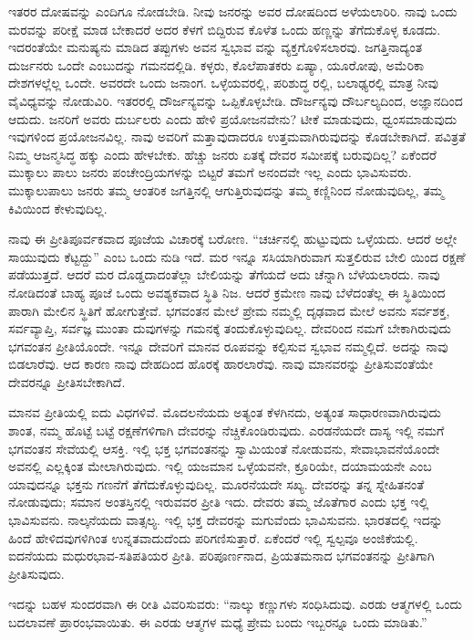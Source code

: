 ಇತರರ ದೋಷವನ್ನು ಎಂದಿಗೂ ನೋಡಬೇಡಿ. ನೀವು ಜನರನ್ನು ಅವರ ದೋಷದಿಂದ ಅಳೆಯಲಾರಿರಿ. ನಾವು ಒಂದು ಮರವನ್ನು ಪರೀಕ್ಷೆ ಮಾಡ ಬೇಕಾದರೆ ಅದರ ಕೆಳಗೆ ಬಿದ್ದಿರುವ ಕೊಳೆತ ಒಂದು ಹಣ್ಣನ್ನು ತೆಗೆದುಕೊಳ್ಳ ಕೂಡದು. ಇದರಂತೆಯೇ ಮನುಷ್ಯನು ಮಾಡಿದ ತಪ್ಪುಗಳು ಅವನ ಸ್ವಭಾವ ವನ್ನು ವ್ಯಕ್ತಗೊಳಿಸಲಾರವು. ಜಗತ್ತಿನಾದ್ಯಂತ ದುರ್ಜನರು ಒಂದೇ ಎಂಬುದನ್ನು ಗಮನದಲ್ಲಿಡಿ. ಕಳ್ಳರು, ಕೊಲೆಪಾತಕರು ಏಷ್ಯಾ, ಯೂರೋಪು, ಅಮೆರಿಕಾ ದೇಶಗಳಲ್ಲೆಲ್ಲ ಒಂದೇ. ಅವರದೇ ಒಂದು ಜನಾಂಗ. ಒಳ್ಳೆಯವರಲ್ಲಿ, ಪರಿಶುದ್ಧ ರಲ್ಲಿ, ಬಲಾಢ್ಯರಲ್ಲಿ ಮಾತ್ರ ನೀವು ವೈವಿಧ್ಯವನ್ನು ನೋಡುವಿರಿ. ಇತರರಲ್ಲಿ ದೌರ್ಜನ್ಯವನ್ನು ಒಪ್ಪಿಕೊಳ್ಳಬೇಡಿ. ದೌರ್ಜನ್ಯವು ದೌರ್ಬಲ್ಯದಿಂದ, ಅಜ್ಞಾನದಿಂದ ಆದುದು. ಜನರಿಗೆ ಅವರು ದುರ್ಬಲರು ಎಂದು ಹೇಳಿ ಪ್ರಯೋಜನವೇನು? ಟೀಕೆ ಮಾಡುವುದು, ಧ್ವಂಸಮಾಡುವುದು ಇವುಗಳಿಂದ ಪ್ರಯೋಜನವಿಲ್ಲ. ನಾವು ಅವರಿಗೆ ಮತ್ತಾವುದಾದರೂ ಉತ್ತಮವಾಗಿರುವುದನ್ನು ಕೊಡಬೇಕಾಗಿದೆ. ಪವಿತ್ರತೆ ನಿಮ್ಮ ಆಜನ್ಮಸಿದ್ಧ ಹಕ್ಕು ಎಂದು ಹೇಳಬೇಕು. ಹೆಚ್ಚು ಜನರು ಏತಕ್ಕೆ ದೇವರ ಸಮೀಪಕ್ಕೆ ಬರುವುದಿಲ್ಲ? ಏಕೆಂದರೆ ಮುಕ್ಕಾಲು ಪಾಲು ಜನರು ಪಂಚೇಂದ್ರಿಯಗಳನ್ನು ಬಿಟ್ಟರೆ ತಮಗೆ ಅನಂದವೇ ಇಲ್ಲ ಎಂದು ಭಾವಿಸುವರು. ಮುಕ್ಕಾಲುಪಾಲು ಜನರು ತಮ್ಮ ಆಂತರಿಕ ಜಗತ್ತಿನಲ್ಲಿ ಆಗುತ್ತಿರುವುದನ್ನು ತಮ್ಮ ಕಣ್ಣಿನಿಂದ ನೋಡುವುದಿಲ್ಲ, ತಮ್ಮ ಕಿವಿಯಿಂದ ಕೇಳುವುದಿಲ್ಲ.

ನಾವು ಈ ಪ್ರೀತಿಪೂರ್ವಕವಾದ ಪೂಜೆಯ ವಿಚಾರಕ್ಕೆ ಬರೋಣ. “ಚರ್ಚಿನಲ್ಲಿ ಹುಟ್ಟುವುದು ಒಳ್ಳೆಯದು. ಆದರೆ ಅಲ್ಲೇ ಸಾಯುವುದು ಕೆಟ್ಟದ್ದು” ಎಂಬ ಒಂದು ನುಡಿ ಇದೆ. ಮರ ಇನ್ನೂ ಸಸಿಯಾಗಿರುವಾಗ ಸುತ್ತಲಿರುವ ಬೇಲಿ ಯಿಂದ ರಕ್ಷಣೆ ಪಡೆಯುತ್ತದೆ. ಆದರೆ ಮರ ದೊಡ್ಡದಾದಂತೆಲ್ಲಾ ಬೇಲಿಯನ್ನು ತೆಗೆಯದೆ ಅದು ಚೆನ್ನಾಗಿ ಬೆಳೆಯಲಾರದು. ನಾವು ನೋಡಿದಂತೆ ಬಾಹ್ಯ ಪೂಜೆ ಒಂದು ಅವಶ್ಯಕವಾದ ಸ್ಥಿತಿ ನಿಜ. ಆದರೆ ಕ್ರಮೇಣ ನಾವು ಬೆಳೆದಂತೆಲ್ಲ ಈ ಸ್ಥಿತಿಯಿಂದ ಪಾರಾಗಿ ಮೇಲಿನ ಸ್ಥಿತಿಗೆ ಹೋಗುತ್ತೇವೆ. ಭಗವಂತನ ಮೇಲೆ ಪ್ರೇಮ ನಮ್ಮಲ್ಲಿ ದೃಢವಾದ ಮೇಲೆ ಅವನು ಸರ್ವಶಕ್ತ, ಸರ್ವವ್ಯಾಪ್ತಿ, ಸರ್ವಜ್ಞ ಮುಂತಾ ದುವುಗಳನ್ನು ಗಮನಕ್ಕೆ ತಂದುಕೊಳ್ಳುವುದಿಲ್ಲ. ದೇವರಿಂದ ನಮಗೆ ಬೇಕಾಗಿರುವುದು ಭಗವಂತನ ಪ್ರೀತಿಯೊಂದೇ. ಇನ್ನೂ ದೇವರಿಗೆ ಮಾನವ ರೂಪವನ್ನು ಕಲ್ಪಿಸುವ ಸ್ವಭಾವ ನಮ್ಮಲ್ಲಿದೆ. ಅದನ್ನು ನಾವು ಬಿಡಲಾರೆವು. ಆದ ಕಾರಣ ನಾವು ದೇಹದಿಂದ ಹೊರಕ್ಕೆ ಹಾರಲಾರೆವು. ನಾವು ಮಾನವರನ್ನು ಪ್ರೀತಿಸುವಂತೆಯೇ ದೇವರನ್ನೂ ಪ್ರೀತಿಸಬೇಕಾಗಿದೆ.

ಮಾನವ ಪ್ರೀತಿಯಲ್ಲಿ ಐದು ವಿಧಗಳಿವೆ. ಮೊದಲನೆಯದು ಅತ್ಯಂತ ಕೆಳಗಿನದು, ಅತ್ಯಂತ ಸಾಧಾರಣವಾಗಿರುವುದು ಶಾಂತ, ನಮ್ಮ ಹೊಟ್ಟೆ ಬಟ್ಟೆ ರಕ್ಷಣೆಗಳಿಗಾಗಿ ದೇವರನ್ನು ನೆಚ್ಚಿಕೊಂಡಿರುವುದು. ಎರಡನೆಯದೇ ದಾಸ್ಯ ಇಲ್ಲಿ ನಮಗೆ ಭಗವಂತನ ಸೇವೆಯಲ್ಲಿ ಆಸಕ್ತಿ. ಇಲ್ಲಿ ಭಕ್ತ ಭಗವಂತನನ್ನು ಸ್ವಾಮಿಯಂತೆ ನೋಡುವನು, ಸೇವಾಭಾವನೆಯೊಂದೇ ಅವನಲ್ಲಿ ಎಲ್ಲಕ್ಕಿಂತ ಮೇಲಾಗಿರುವುದು. ಇಲ್ಲಿ ಯಜಮಾನ ಒಳ್ಳೆಯವನೇ, ಕ್ರೂರಿಯೇ, ದಯಾಮಯನೇ ಎಂಬ ಯಾವುದನ್ನೂ ಭಕ್ತನು ಗಣನೆಗೆ ತೆಗೆದುಕೊಳ್ಳುವುದಿಲ್ಲ. ಮೂರನೆಯದೇ ಸಖ್ಯ. ದೇವರನ್ನು ತನ್ನ ಸ್ನೇಹಿತನಂತೆ ನೋಡುವುದು; ಸಮಾನ ಅಂತಸ್ತಿನಲ್ಲಿ ಇರುವವರ ಪ್ರೀತಿ ಇದು. ದೇವರು ತಮ್ಮ ಜೊತೆಗಾರ ಎಂದು ಭಕ್ತ ಇಲ್ಲಿ ಭಾವಿಸುವನು. ನಾಲ್ಕನೆಯದು ವಾತ್ಸಲ್ಯ. ಇಲ್ಲಿ ಭಕ್ತ ದೇವರನ್ನು ಮಗುವೆಂದು ಭಾವಿಸುವನು. ಭಾರತದಲ್ಲಿ ಇದನ್ನು ಹಿಂದೆ ಹೇಳಿದವುಗಳಿಗಿಂತ ಉನ್ನತವಾದುದೆಂದು ಪರಿಗಣಿಸುತ್ತಾರೆ. ಏಕೆಂದರೆ ಇಲ್ಲಿ ಸ್ವಲ್ಪವೂ ಅಂಜಿಕೆಯಲ್ಲಿ. ಐದನೆಯದು ಮಧುರಭಾವ-ಸತಿಪತಿಯರ ಪ್ರೀತಿ. ಪರಿಪೂರ್ಣನಾದ, ಪ್ರಿಯತಮನಾದ ಭಗವಂತನನ್ನು ಪ್ರೀತಿಗಾಗಿ ಪ್ರೀತಿಸುವುದು.

ಇದನ್ನು ಬಹಳ ಸುಂದರವಾಗಿ ಈ ರೀತಿ ವಿವರಿಸುವರು: “ನಾಲ್ಕು ಕಣ್ಣುಗಳು ಸಂಧಿಸಿದುವು. ಎರಡು ಆತ್ಮಗಳಲ್ಲಿ ಒಂದು ಬದಲಾವಣೆ ಪ್ರಾರಂಭವಾಯಿತು. ಈ ಎರಡು ಆತ್ಮಗಳ ಮಧ್ಯೆ ಪ್ರೇಮ ಬಂದು ಇಬ್ಬರನ್ನೂ ಒಂದು ಮಾಡಿತು.”

